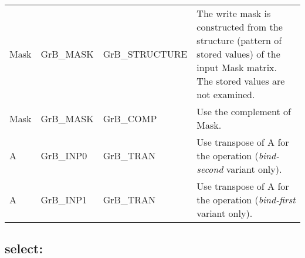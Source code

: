 \begin{itemize}[leftmargin=1.1in]
\begin{tabular}{lllp{2.7in}}
        {\sf Mask} & {\sf GrB\_MASK} & {\sf GrB\_STRUCTURE}   & The write mask is
        constructed from the structure (pattern of stored values) of the input
        {\sf Mask} matrix. The stored values are not examined.\\

        {\sf Mask} & {\sf GrB\_MASK} & {\sf GrB\_COMP}   & Use the 
        complement of {\sf Mask}. \\

        {\sf A}    & {\sf GrB\_INP0} & {\sf GrB\_TRAN}   & Use transpose of {\sf A}
        for the operation ({\em bind-second} variant only). \\

        {\sf A}    & {\sf GrB\_INP1} & {\sf GrB\_TRAN}   & Use transpose of {\sf A}
        for the operation ({\em bind-first} variant only). \\
    \end{tabular}
\end{itemize}



\subsection{{\sf select}: }